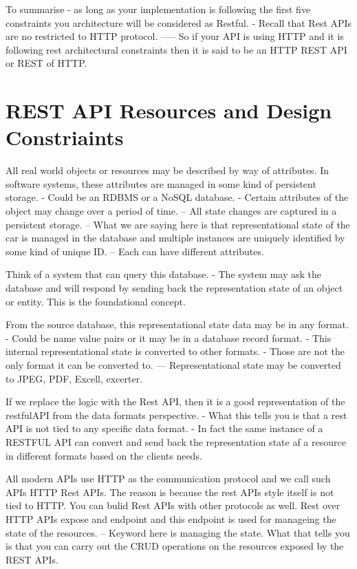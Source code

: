 To summarise - as long as your implementation is following the first five constraints you architecture will be considered as Restful.
- Recall that Rest APIs are no restricted to HTTP protocol.
----- So if your API is using HTTP and it is following rest architectural constraints then it is said to be an HTTP REST API or REST of HTTP.

\section{REST API Resources and Design Constriaints}
All real world objects or resources may be described by way of attributes.
In software systems, these attributes are managed in some kind of persistent storage.
- Could be an RDBMS or a NoSQL database.
- Certain attributes of the object may change over a period of time.
-- All state changes are captured in a persistent storage.
-- What we are saying here is that representational state of the car is managed in the database and multiple instances are uniquely identified by some kind of unique ID.
-- Each can have different attributes.

Think of a system that can query this database.
- The system may ask the database and will respond by sending back the representation state of an object or entity.
This is the foundational concept.

From the source database, this representational state data may be in any format.
- Could be name value pairs or it may be in a database record format.
- This internal representational state is converted to other formats.
- Those are not the only format it can be converted to.
--- Representational state may be converted to JPEG, PDF, Excell, excerter.

If we replace the logic with the Rest API, then it is a good representation of the restfulAPI from the data formats perspective.
- What this tells you is that a rest API is not tied to any specific data format.
- In fact the same instance of a RESTFUL API can convert and send back the representation state af a resource in different formats based on the clients needs.

All modern APIs use HTTP as the communication protocol and we call such APIs HTTP Rest APIs.
The reason is because the rest APIs style itself is not tied to HTTP.
You can bulid Rest APIs with other protocols as well.
Rest over HTTP APIs expose and endpoint and this endpoint is used for manageing the state of the resources.
-- Keyword here is managing the state.
What that tells you is that you can carry out the CRUD operations on the resources exposed by the REST APIs.

